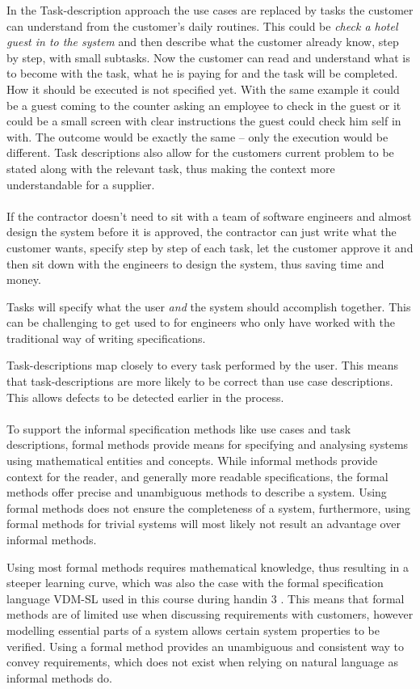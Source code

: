 \documentclass[Main]{subfiles}
\begin{document}
In the Task-description approach the use cases are replaced by tasks the customer can understand from the customer's daily routines.
This could be \textit{check a hotel guest in to the system} and then describe what the customer already know, step by step, with small subtasks.
Now the customer can read and understand what is to become with the task, what he is paying for and the task will be completed.
How it should be executed is not specified yet.
With the same example it could be a guest coming to the counter asking an employee to check in the guest or it could be a small screen with clear instructions the guest could check him self in with.
The outcome would be exactly the same -- only the execution would be different. Task descriptions also allow for the customers current problem to be stated along with the relevant task, thus making the context more understandable for a supplier.
\\
\\
If the contractor doesn't need to sit with a team of software engineers and almost design the system before it is approved, the contractor can just write what the customer wants, specify step by step of each task, let the customer approve it and then sit down with the engineers to design the system, thus saving time and money.

Tasks will specify what the user \textit{and} the system should accomplish together.
This can be challenging to get used to for engineers who only have worked with the traditional way of writing specifications.

Task-descriptions map closely to every task performed by the user. This means that task-descriptions are more likely to be correct than use case descriptions. This allows defects to be detected earlier in the process.
\\
\\
To support the informal specification methods like use cases and task descriptions, formal methods provide means for specifying and analysing systems using mathematical entities and concepts. While informal methods provide context for the reader, and generally more readable specifications, the formal methods offer precise and unambiguous methods to describe a system. Using formal methods does not ensure the completeness of a system, furthermore, using formal methods for trivial systems will most likely not result an advantage over informal methods. 

Using most formal methods requires mathematical knowledge, thus resulting in a steeper learning curve, which was also the case with the formal specification language VDM-SL used in this course during handin 3 \parencite[]{HI3}. This means that formal methods are of limited use when discussing requirements with customers, however modelling essential parts of a system allows certain system properties to be verified. Using a formal method provides an unambiguous and consistent way to convey requirements, which does not exist when relying on natural language as informal methods do.
\end{document}
